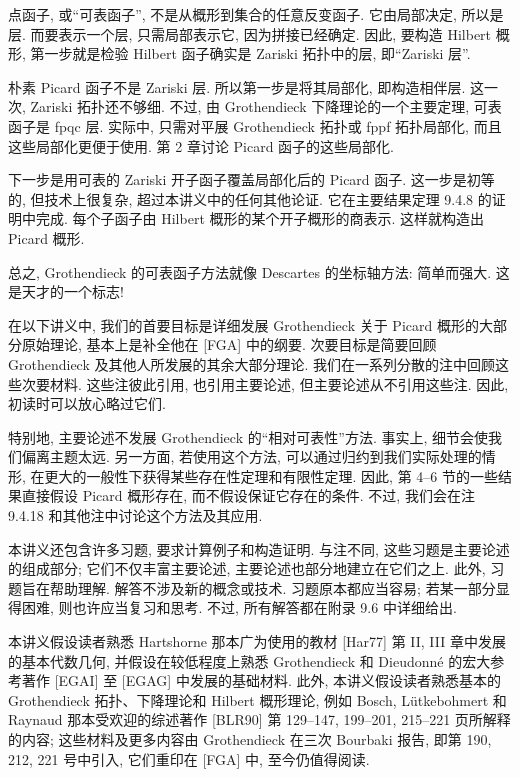 点函子, 或“可表函子”, 不是从概形到集合的任意反变函子. 它由局部决定, 所以是层. 而要表示一个层, 只需局部表示它, 因为拼接已经确定. 因此, 要构造 Hilbert 概形, 第一步就是检验 Hilbert 函子确实是 Zariski 拓扑中的层, 即“Zariski 层”.

朴素 Picard 函子不是 Zariski 层. 所以第一步是将其局部化, 即构造相伴层. 这一次, Zariski 拓扑还不够细. 不过, 由 Grothendieck 下降理论的一个主要定理, 可表函子是 fpqc 层. 实际中, 只需对平展 Grothendieck 拓扑或 fppf 拓扑局部化, 而且这些局部化更便于使用. 第 2 章讨论 Picard 函子的这些局部化.

下一步是用可表的 Zariski 开子函子覆盖局部化后的 Picard 函子. 这一步是初等的, 但技术上很复杂, 超过本讲义中的任何其他论证. 它在主要结果定理 9.4.8 的证明中完成. 每个子函子由 Hilbert 概形的某个开子概形的商表示. 这样就构造出 Picard 概形.

总之, Grothendieck 的可表函子方法就像 Descartes 的坐标轴方法: 简单而强大. 这是天才的一个标志!

在以下讲义中, 我们的首要目标是详细发展 Grothendieck 关于 Picard 概形的大部分原始理论, 基本上是补全他在 [FGA] 中的纲要. 次要目标是简要回顾 Grothendieck 及其他人所发展的其余大部分理论. 我们在一系列分散的注中回顾这些次要材料. 这些注彼此引用, 也引用主要论述, 但主要论述从不引用这些注. 因此, 初读时可以放心略过它们.

特别地, 主要论述不发展 Grothendieck 的“相对可表性”方法. 事实上, 细节会使我们偏离主题太远. 另一方面, 若使用这个方法, 可以通过归约到我们实际处理的情形, 在更大的一般性下获得某些存在性定理和有限性定理. 因此, 第 4--6 节的一些结果直接假设 Picard 概形存在, 而不假设保证它存在的条件. 不过, 我们会在注 9.4.18 和其他注中讨论这个方法及其应用.

本讲义还包含许多习题, 要求计算例子和构造证明. 与注不同, 这些习题是主要论述的组成部分; 它们不仅丰富主要论述, 主要论述也部分地建立在它们之上. 此外, 习题旨在帮助理解. 解答不涉及新的概念或技术. 习题原本都应当容易; 若某一部分显得困难, 则也许应当复习和思考. 不过, 所有解答都在附录 9.6 中详细给出.

本讲义假设读者熟悉 Hartshorne 那本广为使用的教材 [Har77] 第 II, III 章中发展的基本代数几何, 并假设在较低程度上熟悉 Grothendieck 和 Dieudonné 的宏大参考著作 [EGAI] 至 [EGAG] 中发展的基础材料. 此外, 本讲义假设读者熟悉基本的 Grothendieck 拓扑、下降理论和 Hilbert 概形理论, 例如 Bosch, Lütkebohmert 和 Raynaud 那本受欢迎的综述著作 [BLR90] 第 129--147, 199--201, 215--221 页所解释的内容; 这些材料及更多内容由 Grothendieck 在三次 Bourbaki 报告, 即第 190, 212, 221 号中引入, 它们重印在 [FGA] 中, 至今仍值得阅读.

